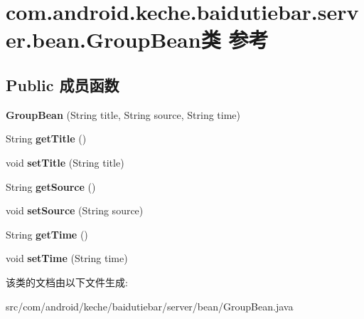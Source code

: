 \hypertarget{classcom_1_1android_1_1keche_1_1baidutiebar_1_1server_1_1bean_1_1_group_bean}{}\section{com.\+android.\+keche.\+baidutiebar.\+server.\+bean.\+Group\+Bean类 参考}
\label{classcom_1_1android_1_1keche_1_1baidutiebar_1_1server_1_1bean_1_1_group_bean}
\subsection*{Public 成员函数}
\begin{DoxyCompactItemize}
\item 
\mbox{\label{classcom_1_1android_1_1keche_1_1baidutiebar_1_1server_1_1bean_1_1_group_bean_a29ff414d1a7b9cf2e942da2c694aee2f}} 
{\bfseries Group\+Bean} (String title, String source, String time)
\item 
\mbox{\label{classcom_1_1android_1_1keche_1_1baidutiebar_1_1server_1_1bean_1_1_group_bean_a9005a28086e56f820c3ed5818d9d49cf}} 
String {\bfseries get\+Title} ()
\item 
\mbox{\label{classcom_1_1android_1_1keche_1_1baidutiebar_1_1server_1_1bean_1_1_group_bean_ae6a93af6b72e9d2c0661fe263f148aca}} 
void {\bfseries set\+Title} (String title)
\item 
\mbox{\label{classcom_1_1android_1_1keche_1_1baidutiebar_1_1server_1_1bean_1_1_group_bean_a780ba7471be9a3c53fd1e8b9766e0a38}} 
String {\bfseries get\+Source} ()
\item 
\mbox{\label{classcom_1_1android_1_1keche_1_1baidutiebar_1_1server_1_1bean_1_1_group_bean_ab94c30822e9a3cccd2c3ac7893167dfb}} 
void {\bfseries set\+Source} (String source)
\item 
\mbox{\label{classcom_1_1android_1_1keche_1_1baidutiebar_1_1server_1_1bean_1_1_group_bean_a9280df18ab3ae1cdd5266ee9e32e9d6d}} 
String {\bfseries get\+Time} ()
\item 
\mbox{\label{classcom_1_1android_1_1keche_1_1baidutiebar_1_1server_1_1bean_1_1_group_bean_a5507bf6820306e8e5f06541739284b90}} 
void {\bfseries set\+Time} (String time)
\end{DoxyCompactItemize}


该类的文档由以下文件生成\+:\begin{DoxyCompactItemize}
\item 
src/com/android/keche/baidutiebar/server/bean/Group\+Bean.\+java\end{DoxyCompactItemize}

